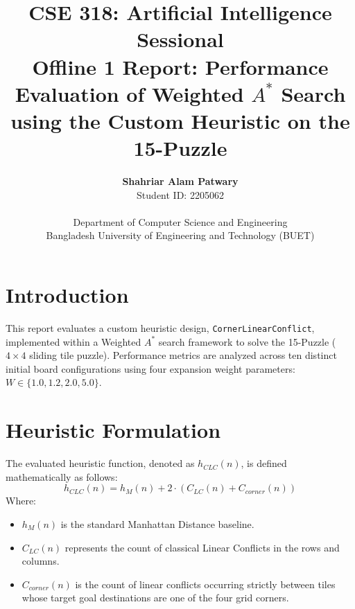 \documentclass[11pt,a4paper]{article}
\title{
    \textbf{\Large CSE 318: Artificial Intelligence Sessional} \\
    \Large Offline 1 Report: Performance Evaluation of Weighted $A^*$ Search using the Custom Heuristic on the 15-Puzzle
}
\author{
    \textbf{Shahriar Alam Patwary} \\
    Student ID: 2205062 \\
    \vspace{0.2em} \\
    \small Department of Computer Science and Engineering \\
    \small Bangladesh University of Engineering and Technology (BUET)
}
\date{}
\begin{document}
\maketitle

\section{Introduction}
This report evaluates a custom heuristic design, \texttt{CornerLinearConflict}, implemented within a Weighted $A^*$ search framework to solve the 15-Puzzle ($4 \times 4$ sliding tile puzzle). Performance metrics are analyzed across ten distinct initial board configurations using four expansion weight parameters: $W \in \{1.0, 1.2, 2.0, 5.0\}$. 

\section{Heuristic Formulation}
The evaluated heuristic function, denoted as $h_{CLC}(n)$, is defined mathematically as follows:
\begin{equation}
    h_{CLC}(n) = h_M(n) + 2 \cdot \left( C_{LC}(n) + C_{corner}(n) \right)
\end{equation}
Where:
\begin{itemize}
    \item $h_M(n)$ is the standard Manhattan Distance baseline.
    \item $C_{LC}(n)$ represents the count of classical Linear Conflicts in the rows and columns.
    \item $C_{corner}(n)$ is the count of linear conflicts occurring strictly between tiles whose target goal destinations are one of the four grid corners.
\end{itemize}
\end{document}
